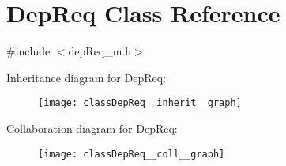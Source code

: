\hypertarget{classDepReq}{}\section{Dep\+Req Class Reference}
\label{classDepReq}


{\ttfamily \#include $<$dep\+Req\+\_\+m.\+h$>$}



Inheritance diagram for Dep\+Req\+:\nopagebreak
\begin{figure}[H]
\begin{center}
\leavevmode
\texttt{[image: classDepReq\_\_inherit\_\_graph]}
\end{center}
\end{figure}


Collaboration diagram for Dep\+Req\+:\nopagebreak
\begin{figure}[H]
\begin{center}
\leavevmode
\texttt{[image: classDepReq\_\_coll\_\_graph]}
\end{center}
\end{figure}
